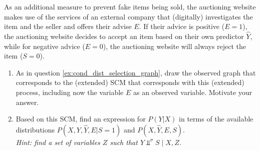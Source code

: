 As an additional measure to prevent fake items being sold, the auctioning website makes use of the services of an external company that (digitally) investigates the item and the seller and offers their advise $E$.
If their advice is positive ($E=1$), the auctioning website decides to accept an item based on their own predictor $\hat{Y}$, while for negative advice ($E=0$), the auctioning website will always reject the item ($S=0$).
\begin{enumerate}[resume*]
  \item As in question \ref{ex:cond_dist_selection_graph}, draw the observed graph that corresponds to the (extended) SCM that corresponds with this (extended) process, including now the variable $E$ as an observed variable.
    Motivate your answer.
  \item Based on this SCM, find an expression for $P(Y|X)$ in terms of the available distributions $P(X, Y, \hat{Y}, E|S=1)$ and $P(X, \hat{Y}, E, S)$.\\
    \emph{Hint: find a set of variables $Z$ such that $Y \Perp^\sigma S \mid X, Z$.}

\end{enumerate}
